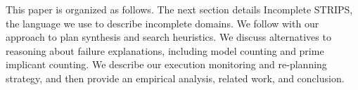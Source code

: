 \documentclass{article}
\def\FFRISKY{{\tt DeFAULT}}
\def\goalie{{\tt Goalie}}
\begin{document}
% 


This paper is organized as follows.  The next section details Incomplete STRIPS,
the language we use to describe incomplete domains.  We follow with our approach
to plan synthesis and search heuristics.  We discuss alternatives to reasoning
about failure explanations, including model counting and prime implicant
counting.  We describe our execution monitoring and re-planning strategy, and
then provide an empirical analysis, related work, and conclusion.
  
\end{document}
